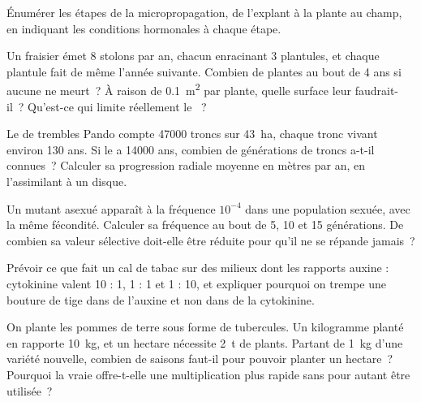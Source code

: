 \begin{exercise}[$\star$]\label{exo:b2:asexual-reproduction:4}
Énumérer les étapes de la micropropagation, de l'explant à la plante au
champ, en indiquant les conditions hormonales à chaque étape.
\end{exercise}

\begin{exercise}[$\star\star$]\label{exo:b2:asexual-reproduction:5}
Un fraisier émet 8 stolons par an, chacun enracinant 3 plantules, et
chaque plantule fait de même l'année suivante. Combien de plantes au
bout de 4 ans si aucune ne meurt~? À raison de \qty{0.1}{m^2} par
plante, quelle surface leur faudrait-il~? Qu'est-ce qui limite
réellement le ~?
\end{exercise}

\begin{exercise}[$\star\star$]\label{exo:b2:asexual-reproduction:6}
Le  de trembles Pando compte \num{47000} troncs sur \qty{43}{ha},
chaque tronc vivant environ \num{130} ans. Si le  a \num{14000}
ans, combien de générations de troncs a-t-il connues~? Calculer sa
progression radiale moyenne en mètres par an, en l'assimilant à un
disque.
\end{exercise}

\begin{exercise}[$\star\star$]\label{exo:b2:asexual-reproduction:7}
Un mutant asexué apparaît à la fréquence $10^{-4}$ dans une population
sexuée, avec la même fécondité. Calculer sa fréquence au bout de 5, 10
et 15 générations. De combien sa valeur sélective doit-elle être réduite
pour qu'il ne se répande jamais~?
\end{exercise}

\begin{exercise}[$\star\star$]\label{exo:b2:asexual-reproduction:8}
Prévoir ce que fait un cal de tabac sur des milieux dont les rapports
auxine : cytokinine valent 10 : 1, 1 : 1 et 1 : 10, et expliquer
pourquoi on trempe une bouture de tige dans de l'auxine et non dans de
la cytokinine.
\end{exercise}

\begin{exercise}[$\star\star$]\label{exo:b2:asexual-reproduction:9}
On plante les pommes de terre sous forme de tubercules. Un kilogramme
planté en rapporte \qty{10}{kg}, et un hectare nécessite \qty{2}{t} de
plants. Partant de \qty{1}{kg} d'une variété nouvelle, combien de
saisons faut-il pour pouvoir planter un hectare~? Pourquoi la vraie
 offre-t-elle une multiplication plus rapide sans pour autant
être utilisée~?
\end{exercise}

